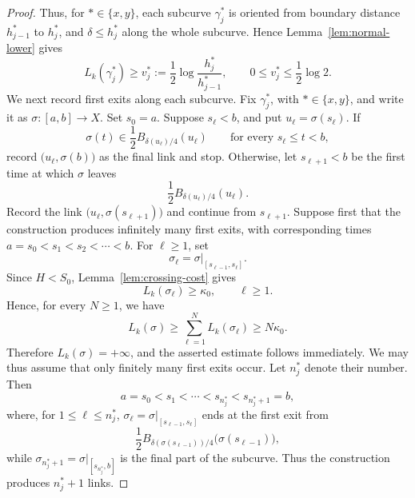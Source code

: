 \documentclass[11pt]{article}
\theoremstyle{definition}
\begin{document}
\begin{proof}
	Thus, for \(\ast\in\{x,y\}\), each subcurve
	\(\gamma_j^\ast\) is oriented from boundary distance
	\(h_{j-1}^\ast\) to \(h_j^\ast\), and
	\(\delta\le h_j^\ast\)
	along the whole subcurve.  Hence Lemma~\ref{lem:normal-lower} gives
	\begin{equation}\label{eq:normal-cost-one-level}
		L_k(\gamma_j^\ast)
		\ge
		v_j^\ast
		:=
		\frac12\log\frac{h_j^\ast}{h_{j-1}^\ast},
		\qquad
		0\le v_j^\ast\le\frac12\log2.
	\end{equation}
	We next record first exits along each subcurve.  Fix
	\(\gamma_j^\ast\), with \(\ast\in\{x,y\}\), and write it as
	\(
	\sigma:[a,b]\to X.
\)
	Set \(s_0=a\).  Suppose \(s_\ell<b\), and put
	\(
	u_\ell=\sigma(s_\ell).
	\)
	If
	\[
	\sigma(t)\in
	\frac12 B_{\delta(u_\ell)/4}(u_\ell)
	\qquad
	\text{for every }s_\ell\le t<b,
	\]
	record
\(
	\bigl(u_\ell,\sigma(b)\bigr)
\)
	as the final link and stop.  Otherwise, let \(s_{\ell+1}<b\) be the
	first time at which \(\sigma\) leaves
	\[
	\frac12 B_{\delta(u_\ell)/4}(u_\ell).
	\]
	Record the link
	\(
	\bigl(u_\ell,\sigma(s_{\ell+1})\bigr)
	\)
	and continue from \(s_{\ell+1}\).
Suppose first that the construction produces infinitely many first exits,
with corresponding times
\(a=s_0<s_1<s_2<\cdots<b\).
For \(\ell\ge1\), set
\[
\sigma_\ell
=
\sigma|_{[s_{\ell-1},s_\ell]}.
\]
  Since \(H<S_0\), Lemma~\ref{lem:crossing-cost} gives
\[
L_k(\sigma_\ell)\ge\kappa_0,
\qquad \ell\ge1.
\]
Hence, for every \(N\ge1\), we have
\[
L_k(\sigma)
\ge
\sum_{\ell=1}^N L_k(\sigma_\ell)
\ge
N\kappa_0.
\]
Therefore \(L_k(\sigma)=+\infty\), and the asserted estimate follows
immediately.
We may thus assume that only finitely many first exits occur.  Let
\(n_j^\ast\) denote their number.  Then
\[
a=s_0<s_1<\cdots<s_{n_j^\ast}<s_{n_j^\ast+1}=b,
\]
where, for \(1\le\ell\le n_j^\ast\),
\(
\sigma_\ell
=
\sigma|_{[s_{\ell-1},s_\ell]}
\)
ends at the first exit from
\[
\frac12
B_{\delta(\sigma(s_{\ell-1}))/4}
\bigl(\sigma(s_{\ell-1})\bigr),
\]
while
\(
\sigma_{n_j^\ast+1}
=
\sigma|_{[s_{n_j^\ast},b]}
\)
is the final part of the subcurve.  Thus the construction produces
\(n_j^\ast+1\) links.


\end{proof}
\end{document}
